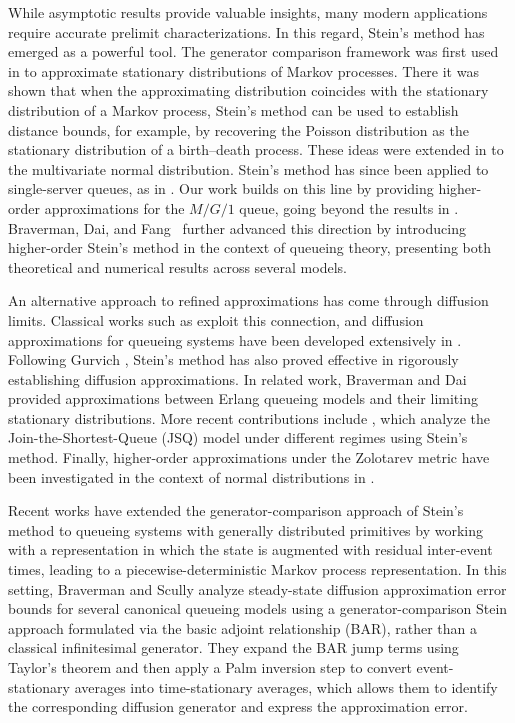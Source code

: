 \documentclass[11pt,letterpaper,reqno]{article}
\theoremstyle{thmstyleone}%
\theoremstyle{thmstyletwo}%
\theoremstyle{thmstylethree}%
\numberwithin{equation}{section}
\begin{document}
While asymptotic results provide valuable insights, many modern applications require accurate prelimit characterizations. In this regard, Stein’s method has emerged as a powerful tool. The generator comparison framework was first used in \cite{Ba} to approximate stationary distributions of Markov processes. There it was shown that when the approximating distribution coincides with the stationary distribution of a Markov process, Stein’s method can be used to establish distance bounds, for example, by recovering the Poisson distribution as the stationary distribution of a birth–death process. These ideas were extended in \cite{Ba2} to the multivariate normal distribution. Stein’s method has since been applied to single-server queues, as in \cite{WG}. Our work builds on this line by providing higher-order approximations for the $M/G/1$ queue, going beyond the results in \cite{WG}. 
Braverman, Dai, and Fang~\cite{BDF} further advanced this direction by introducing higher-order Stein’s method in the context of queueing theory, presenting both theoretical and numerical results across several models.

An alternative approach to refined approximations has come through diffusion limits. Classical works such as \cite{BX,KT} exploit this connection, and diffusion approximations for queueing systems have been developed extensively in \cite{MB,HA,TO,PE,RE,RJ}. Following Gurvich \cite{GU}, Stein’s method has also proved effective in rigorously establishing diffusion approximations. In related work, Braverman and Dai \cite{BAD,DB} provided approximations between Erlang queueing models and their limiting stationary distributions. More recent contributions include \cite{MH,BrAn}, which analyze the Join-the-Shortest-Queue (JSQ) model under different regimes using Stein’s method. Finally, higher-order approximations under the Zolotarev metric have been investigated in the context of normal distributions in \cite{GA,MF}.

Recent works \cite{BS2024, BS2025} have extended the generator-comparison approach of Stein’s method to queueing systems with generally distributed primitives by working with a representation in which the state is augmented with residual inter-event times, leading to a piecewise-deterministic Markov process  representation. In this setting, Braverman and Scully \cite{BS2024} analyze steady-state diffusion approximation error bounds for several canonical queueing models using a generator-comparison Stein approach formulated via the basic adjoint relationship (BAR), rather than a classical infinitesimal generator. They expand the BAR jump terms using Taylor’s theorem and then apply a Palm inversion step to convert event-stationary averages into time-stationary averages, which allows them to identify the corresponding diffusion generator and express the approximation error.
\end{document}
